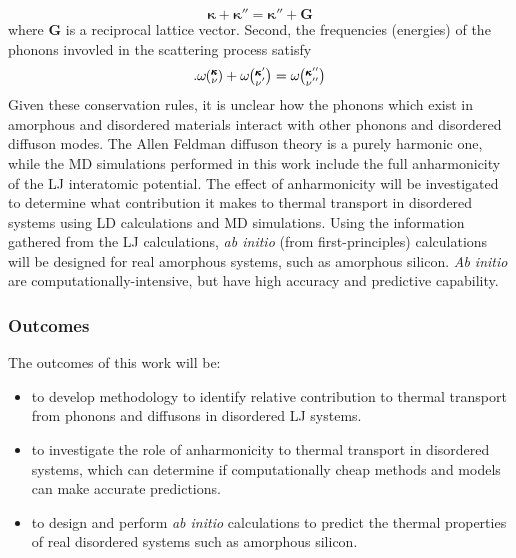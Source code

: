 \documentclass[letterpaper,12pt]{article}
\newcommand{\kv}{\mspace{-4.0mu}\left(\mspace{-8.0mu}\begin{smallmatrix}&\pmb{\kappa} \\&\nu\end{smallmatrix}\mspace{-3.0mu}\right)}
\newcommand{\kvp}{\mspace{-4.0mu}\left(\mspace{-8.0mu}\begin{smallmatrix}&\pmb{\kappa}' \\&\nu'\end{smallmatrix}\mspace{-3.0mu}\right)}
\newcommand{\kvpp}{\mspace{-4.0mu}\left(\mspace{-8.0mu}\begin{smallmatrix}&\pmb{\kappa}'' \\&\nu''\end{smallmatrix}\mspace{-3.0mu}\right)}
\begin{document}
\begin{equation}\label{EQ:M:conservation-crys-mom}
\pmb{\kappa} + \pmb{\kappa}'' = \pmb{\kappa}'' + \pmb{G}
\end{equation}
where $\pmb{G}$ is a reciprocal lattice vector.\cite{wallace1972,dove1993} Second, the frequencies (energies) of the phonons invovled in the scattering process satisfy\cite{wallace1972,dove1993}
\begin{equation}\label{EQ:M:conservation-phonon-energy}.
\omega\kv + \omega\kvp = \omega\kvpp 
\end{equation}
Given these conservation rules, it is unclear how the phonons which exist in amorphous and disordered materials interact with other phonons and disordered diffuson modes.
The Allen Feldman diffuson theory is a purely harmonic one, while the MD simulations performed in this work include the full anharmonicity of the LJ interatomic potential. The effect of anharmonicity will be investigated to determine what contribution it makes to thermal transport in disordered systems using LD calculations and MD simulations. Using the information gathered from the LJ calculations, \emph{ab initio} (from first-principles)\cite{baroni2001} calculations will be designed for real amorphous systems, such as amorphous silicon. \emph{Ab initio} are computationally-intensive, but have high accuracy and predictive capability.\cite{baroni2001} 
\subsubsection{\label{S:Resarch-Objectives-1-outcomes}Outcomes}
The outcomes of this work will be:
\begin{itemize}
\item to develop methodology to identify relative contribution to thermal transport from phonons and diffusons in disordered LJ systems. 
\item to investigate the role of anharmonicity to thermal transport in disordered systems, which can determine if computationally cheap methods and models can make accurate predictions.
\item to design and perform \emph{ab initio} calculations to predict the thermal properties of real disordered systems such as amorphous silicon.
\end{itemize}
\end{document}
